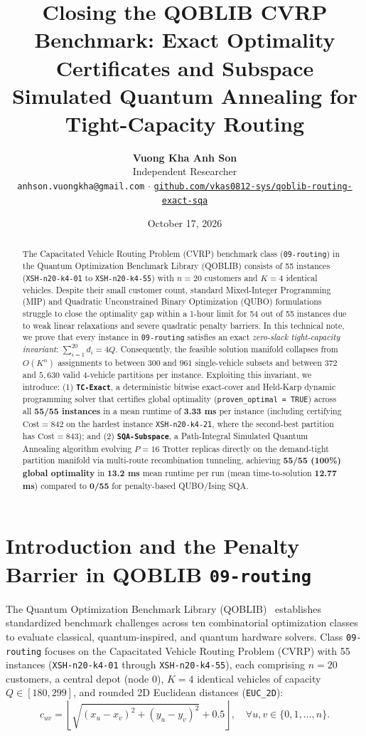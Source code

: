 \documentclass[10pt,a4paper]{article}
\title{\Large\textbf{Closing the QOBLIB CVRP Benchmark: Exact Optimality Certificates and Subspace Simulated Quantum Annealing for Tight-Capacity Routing}}
\author{
  \textbf{Vuong Kha Anh Son} \\
  Independent Researcher \\
  \small\texttt{anhson.vuongkha@gmail.com} $\cdot$ \href{https://github.com/vkas0812-sys/qoblib-routing-exact-sqa}{\texttt{github.com/vkas0812-sys/qoblib-routing-exact-sqa}}
}
\date{October 17, 2026}
\begin{document}
\maketitle

\begin{abstract}
\noindent
The Capacitated Vehicle Routing Problem (CVRP) benchmark class (\texttt{09-routing}) in the Quantum Optimization Benchmark Library (QOBLIB) consists of 55 instances (\texttt{XSH-n20-k4-01} to \texttt{XSH-n20-k4-55}) with $n=20$ customers and $K=4$ identical vehicles. Despite their small customer count, standard Mixed-Integer Programming (MIP) and Quadratic Unconstrained Binary Optimization (QUBO) formulations struggle to close the optimality gap within a 1-hour limit for 54 out of 55 instances due to weak linear relaxations and severe quadratic penalty barriers. In this technical note, we prove that every instance in \texttt{09-routing} satisfies an exact \emph{zero-slack tight-capacity invariant}: $\sum_{i=1}^{20} d_i = 4Q$. Consequently, the feasible solution manifold collapses from $O(K^n)$ assignments to between $300$ and $961$ single-vehicle subsets and between $372$ and $5,630$ valid 4-vehicle partitions per instance. Exploiting this invariant, we introduce: (1) \textbf{\texttt{TC-Exact}}, a deterministic bitwise exact-cover and Held-Karp dynamic programming solver that certifies global optimality (\texttt{proven\_optimal = TRUE}) across all \textbf{55/55 instances} in a mean runtime of \textbf{3.33 ms} per instance (including certifying $\text{Cost}=842$ on the hardest instance \texttt{XSH-n20-k4-21}, where the second-best partition has $\text{Cost}=843$); and (2) \textbf{\texttt{SQA-Subspace}}, a Path-Integral Simulated Quantum Annealing algorithm evolving $P=16$ Trotter replicas directly on the demand-tight partition manifold via multi-route recombination tunneling, achieving \textbf{55/55 (100\%) global optimality} in \textbf{13.2 ms} mean runtime per run (mean time-to-solution \textbf{12.77 ms}) compared to \textbf{0/55} for penalty-based QUBO/Ising SQA.
\end{abstract}

\section{Introduction and the Penalty Barrier in QOBLIB \texttt{09-routing}}

The Quantum Optimization Benchmark Library (QOBLIB)~\cite{koch2025qoblib} establishes standardized benchmark challenges across ten combinatorial optimization classes to evaluate classical, quantum-inspired, and quantum hardware solvers. Class \texttt{09-routing} focuses on the Capacitated Vehicle Routing Problem (CVRP) with 55 instances (\texttt{XSH-n20-k4-01} through \texttt{XSH-n20-k4-55}), each comprising $n=20$ customers, a central depot (node $0$), $K=4$ identical vehicles of capacity $Q \in [180, 299]$, and rounded 2D Euclidean distances (\texttt{EUC\_2D}):
\begin{equation}
  c_{uv} = \left\lfloor \sqrt{(x_u - x_v)^2 + (y_u - y_v)^2} + 0.5 \right\rfloor, \quad \forall u, v \in \{0, 1, \dots, n\}.
\end{equation}
\end{document}
